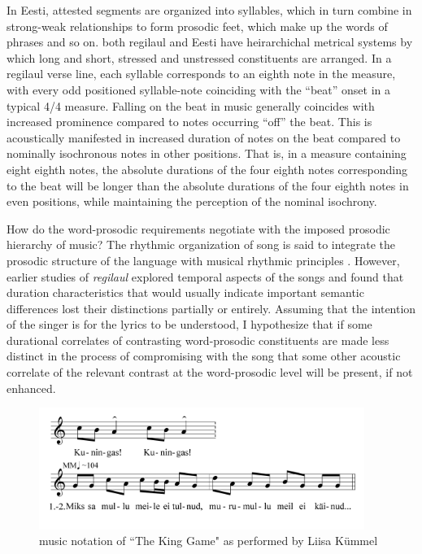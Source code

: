 In Eesti, attested segments are organized into syllables, which in turn combine in strong-weak relationships to form prosodic feet, which make up the words of phrases and so on. 
both regilaul and Eesti have heirarchichal metrical systems by which long and short, stressed and unstressed constituents are arranged. 
 In a regilaul verse line, each syllable corresponds to an eighth note in the measure, with every odd positioned syllable-note coinciding with the ``beat'' onset in a typical 4/4 measure. Falling on the beat in music generally coincides with increased prominence compared to notes occurring ``off'' the beat. This is acoustically manifested in increased duration of notes on the beat compared to nominally isochronous notes in other positions. That is, in a measure containing eight eighth notes, the absolute durations of the four eighth notes corresponding to the beat will be longer than the absolute durations of the four eighth notes in even positions, while maintaining the perception of the nominal isochrony. 


How do the word-prosodic requirements negotiate with the imposed prosodic hierarchy of music? The rhythmic organization of song is said to integrate the prosodic structure of the language with musical rhythmic principles \citep{palmerLinguisticProsodyMusical1992}. However, earlier studies of {\it regilaul} explored temporal aspects of the songs and found that duration characteristics that would usually indicate important semantic differences lost their distinctions partially or entirely. Assuming that the intention of the singer is for the lyrics to be understood, I hypothesize that if some durational correlates of contrasting word-prosodic constituents are made less distinct in the process of compromising with the song that some other acoustic correlate of the relevant contrast at the word-prosodic level will be present, if not enhanced.  


\begin{figure}[htbp]
\begin{center}
\includegraphics[width=300pt]{figures/094.png}
\caption{music notation of ``The King Game" as performed by Liisa Kümmel}
\label{The King Game}
\end{center}
\end{figure}

